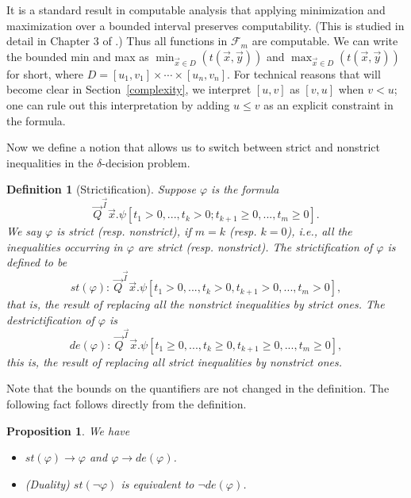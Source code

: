 \documentclass[conference]{IEEEtran}
\newtheorem{proposition}[theorem]{Proposition}
\newtheorem{definition}[theorem]{Definition}
\begin{document}
It is a standard result in computable analysis that applying minimization and maximization over a bounded interval preserves computability. 
(This is studied in detail in Chapter 3 of \cite{Kobook}.) Thus all functions in $\mathcal{F}_{m}$ are computable. We can write the bounded min and max as $\min_{\vec x\in D}(t(\vec x, \vec y))$ and $\max_{\vec x\in D}(t(\vec x, \vec y))$ for short, where $D=[u_1,v_1]\times\cdots\times [u_n,v_n]$. For technical reasons that will become clear in Section~\ref{complexity}, we interpret $[u,v]$ as $[v,u]$ when $v < u$; one can rule out this interpretation by adding $u \leq v$ as an explicit constraint in the formula.


Now we define a notion that allows us to switch between strict and nonstrict inequalities in the $\delta$-decision problem. 

\begin{definition}[Strictification]
Suppose $\varphi$ is the formula
$$\vec Q^{\vec I}\vec x. \psi[t_1>0,...,t_k>0; t_{k+1}\geq 0,...,t_m\geq 0].$$
We say $\varphi$ is strict (resp. nonstrict), if $m=k$ (resp. $k=0$), i.e., all the inequalities occurring in $\varphi$ are strict (resp. nonstrict). The {\em strictification of $\varphi$} is defined to be 
$$\mathit{st}(\varphi):\ \vec Q^{\vec I}\vec x. \psi[t_1>0,...,t_k>0, t_{k+1}> 0,...,t_m>0],$$
that is, the result of replacing all the nonstrict inequalities by strict ones. The {\em destrictification of $\varphi$} is 
$$\mathit{de}(\varphi):\ \vec Q^{\vec I}\vec x. \psi[t_1\geq0,...,t_k\geq0, t_{k+1}\geq 0,...,t_m\geq0],$$
this is, the result of replacing all strict inequalities by nonstrict ones.
\end{definition}

Note that the bounds on the quantifiers are not changed in the definition. The following fact follows directly from the definition.  

\begin{proposition}\label{tr2}
We have 
\begin{itemize}
\item $\mathit{st}(\varphi)\rightarrow\varphi$ and $\varphi\rightarrow\mathit{de}(\varphi)$.
\item (Duality) $\mathit{st}(\neg\varphi)$ is equivalent to $\neg\mathit{de}(\varphi)$. 
\end{itemize}
\end{proposition}
\end{document}
